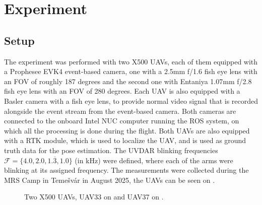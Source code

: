 
\chapter{Experiment\label{chap:experiment}}

\section{Setup}

The experiment was performed with two X500 \ac{UAV}s, each of them equipped with a Prophesee EVK4 event-based camera, one with a 2.5mm f/1.6
fish eye lens with an \ac{FOV} of roughly 187 degrees and the second one with Entaniya 1.07mm f/2.8 fish eye lens with an \ac{FOV} of 280 degrees.
Each UAV is also equipped with a Basler camera with a fish eye lens, to provide normal video signal that is recorded alongside the event stream
from the event-based camera.
Both cameras are connected to the onboard Intel NUC computer running the ROS system, on which all the processing is done during the flight. Both 
\ac{UAV}s are also equipped with a \ac{RTK} module, which is used to localize the \ac{UAV}, and is used as ground truth data for the pose estimation.
The UVDAR blinking frequencies $\mathcal{F} = \{4.0, 2.0, 1.\overline{3}, 1.0\}$ (in kHz) were defined, where each of the arms were blinking at its assigned
frequency.
The measurements were collected during the \ac{MRS} Camp in Temešvár in August 2025, the \ac{UAV}s can be seen on .
\begin{figure}[H]
	\centering
	\caption{
		Two X500 UAVs, UAV33 on  and UAV37 on .
  }
	\label{fig:uav33_37}
\end{figure}
